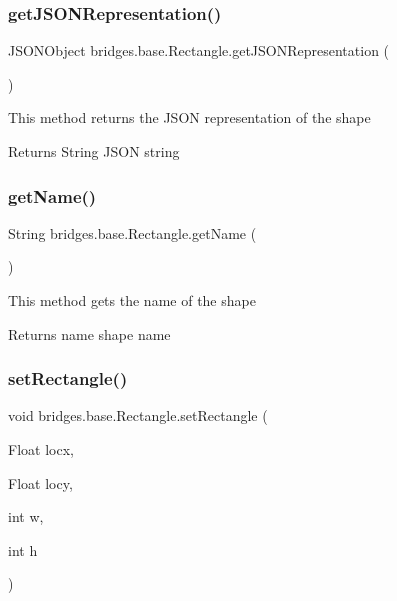 \subsubsection{\texorpdfstring{get\+J\+S\+O\+N\+Representation()}{getJSONRepresentation()}}
{\footnotesize\ttfamily J\+S\+O\+N\+Object bridges.\+base.\+Rectangle.\+get\+J\+S\+O\+N\+Representation (\begin{DoxyParamCaption}{ }\end{DoxyParamCaption})}

This method returns the J\+S\+ON representation of the shape

\begin{DoxyReturn}{Returns}
String J\+S\+ON string 
\end{DoxyReturn}
\mbox{\label{classbridges_1_1base_1_1_rectangle_ab785b45f264ae3cd61a5a898ffa6afba}} 
\subsubsection{\texorpdfstring{get\+Name()}{getName()}}
{\footnotesize\ttfamily String bridges.\+base.\+Rectangle.\+get\+Name (\begin{DoxyParamCaption}{ }\end{DoxyParamCaption})}

This method gets the name of the shape

\begin{DoxyReturn}{Returns}
name shape name 
\end{DoxyReturn}
\mbox{\label{classbridges_1_1base_1_1_rectangle_a7f071805534af749355f3d6122972ab9}} 
\subsubsection{\texorpdfstring{set\+Rectangle()}{setRectangle()}}
{\footnotesize\ttfamily void bridges.\+base.\+Rectangle.\+set\+Rectangle (\begin{DoxyParamCaption}\item[{Float}]{locx,  }\item[{Float}]{locy,  }\item[{int}]{w,  }\item[{int}]{h }\end{DoxyParamCaption})}

